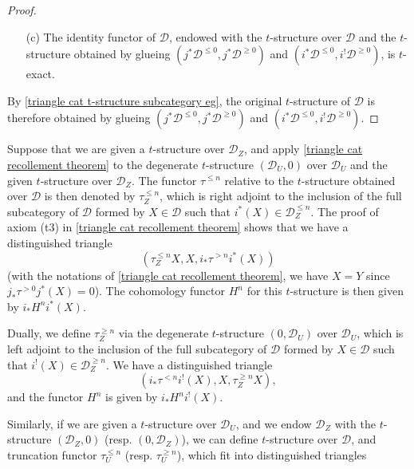 \begin{proof}
\begin{enumerate}
    \item[(c)] The identity functor of $\mathcal{D}$, endowed with the $t$-structure over $\mathcal{D}$ and the $t$-structure obtained by glueing $(j^*\mathcal{D}^{\leq 0},j^*\mathcal{D}^{\geq 0})$ and $(i^*\mathcal{D}^{\leq 0},i^!\mathcal{D}^{\geq 0})$, is $t$-exact.
\end{enumerate}
By \cref{triangle cat t-structure subcategory eg}, the original $t$-structure of $\mathcal{D}$ is therefore obtained by glueing $(j^*\mathcal{D}^{\leq 0},j^*\mathcal{D}^{\geq 0})$ and $(i^*\mathcal{D}^{\leq 0},i^!\mathcal{D}^{\geq 0})$.
\end{proof}

Suppose that we are given a $t$-structure over $\mathcal{D}_Z$, and apply \cref{triangle cat recollement theorem} to the degenerate $t$-structure $(\mathcal{D}_U,0)$ over $\mathcal{D}_U$ and the given $t$-structure over $\mathcal{D}_Z$. The functor $\tau^{\leq n}$ relative to the $t$-structure obtained over $\mathcal{D}$ is then denoted by $\tau^{\leq n}_Z$, which is right adjoint to the inclusion of the full subcategory of $\mathcal{D}$ formed by $X\in\mathcal{D}$ such that $i^*(X)\in\mathcal{D}_Z^{\leq n}$. The proof of axiom (t3) in \cref{triangle cat recollement theorem} shows that we have a distinguished triangle
\begin{equation}\label{triangle cat recollement truncation tau_Z^leq dt}
(\tau^{\leq n}_ZX,X,i_*\tau^{>n}i^*(X))
\end{equation}
(with the notations of \cref{triangle cat recollement theorem}, we have $X=Y$ since $j_*\tau^{>0}j^*(X)=0$). The cohomology functor $H^n$ for this $t$-structure is then given by $i_*H^ni^*(X)$.\par
Dually, we define $\tau^{\geq n}_Z$ via the degenerate $t$-structure $(0,\mathcal{D}_U)$ over $\mathcal{D}_U$, which is left adjoint to the inclusion of the full subcategory of $\mathcal{D}$ formed by $X\in\mathcal{D}$ such that $i^!(X)\in\mathcal{D}_Z^{\geq n}$. We have a distinguished triangle
\begin{equation}\label{triangle cat recollement truncation tau_Z^geq dt}
(i_*\tau^{<n}i^!(X),X,\tau^{\geq n}_ZX),
\end{equation}
and the functor $H^n$ is given by $i_*H^ni^!(X)$.\par
Similarly, if we are given a $t$-structure over $\mathcal{D}_U$, and we endow $\mathcal{D}_Z$ with the $t$-structure $(\mathcal{D}_Z,0)$ (resp. $(0,\mathcal{D}_Z)$), we can define $t$-structure over $\mathcal{D}$, and truncation functor $\tau^{\leq n}_U$ (resp. $\tau^{\geq n}_U$), which fit into distinguished triangles
